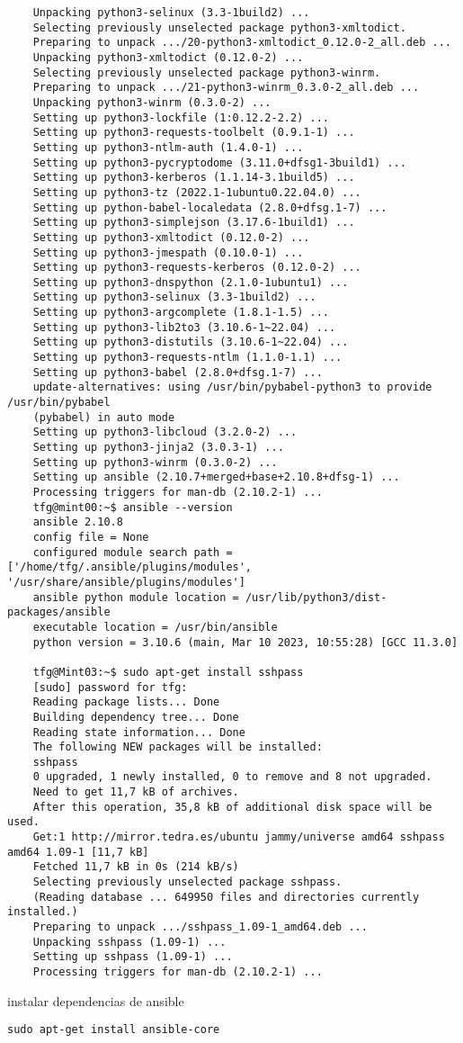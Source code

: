\documentclass[../main.tex]{subfiles}
\begin{document}
\begin{lstlisting}
	Unpacking python3-selinux (3.3-1build2) ...
	Selecting previously unselected package python3-xmltodict.
	Preparing to unpack .../20-python3-xmltodict_0.12.0-2_all.deb ...
	Unpacking python3-xmltodict (0.12.0-2) ...
	Selecting previously unselected package python3-winrm.
	Preparing to unpack .../21-python3-winrm_0.3.0-2_all.deb ...
	Unpacking python3-winrm (0.3.0-2) ...
	Setting up python3-lockfile (1:0.12.2-2.2) ...
	Setting up python3-requests-toolbelt (0.9.1-1) ...
	Setting up python3-ntlm-auth (1.4.0-1) ...
	Setting up python3-pycryptodome (3.11.0+dfsg1-3build1) ...
	Setting up python3-kerberos (1.1.14-3.1build5) ...
	Setting up python3-tz (2022.1-1ubuntu0.22.04.0) ...
	Setting up python-babel-localedata (2.8.0+dfsg.1-7) ...
	Setting up python3-simplejson (3.17.6-1build1) ...
	Setting up python3-xmltodict (0.12.0-2) ...
	Setting up python3-jmespath (0.10.0-1) ...
	Setting up python3-requests-kerberos (0.12.0-2) ...
	Setting up python3-dnspython (2.1.0-1ubuntu1) ...
	Setting up python3-selinux (3.3-1build2) ...
	Setting up python3-argcomplete (1.8.1-1.5) ...
	Setting up python3-lib2to3 (3.10.6-1~22.04) ...
	Setting up python3-distutils (3.10.6-1~22.04) ...
	Setting up python3-requests-ntlm (1.1.0-1.1) ...
	Setting up python3-babel (2.8.0+dfsg.1-7) ...
	update-alternatives: using /usr/bin/pybabel-python3 to provide /usr/bin/pybabel 
	(pybabel) in auto mode
	Setting up python3-libcloud (3.2.0-2) ...
	Setting up python3-jinja2 (3.0.3-1) ...
	Setting up python3-winrm (0.3.0-2) ...
	Setting up ansible (2.10.7+merged+base+2.10.8+dfsg-1) ...
	Processing triggers for man-db (2.10.2-1) ...
	tfg@mint00:~$ ansible --version
	ansible 2.10.8
	config file = None
	configured module search path = ['/home/tfg/.ansible/plugins/modules', '/usr/share/ansible/plugins/modules']
	ansible python module location = /usr/lib/python3/dist-packages/ansible
	executable location = /usr/bin/ansible
	python version = 3.10.6 (main, Mar 10 2023, 10:55:28) [GCC 11.3.0]
	
	tfg@Mint03:~$ sudo apt-get install sshpass
	[sudo] password for tfg:        
	Reading package lists... Done
	Building dependency tree... Done
	Reading state information... Done
	The following NEW packages will be installed:
	sshpass
	0 upgraded, 1 newly installed, 0 to remove and 8 not upgraded.
	Need to get 11,7 kB of archives.
	After this operation, 35,8 kB of additional disk space will be used.
	Get:1 http://mirror.tedra.es/ubuntu jammy/universe amd64 sshpass amd64 1.09-1 [11,7 kB]
	Fetched 11,7 kB in 0s (214 kB/s)    
	Selecting previously unselected package sshpass.
	(Reading database ... 649950 files and directories currently installed.)
	Preparing to unpack .../sshpass_1.09-1_amd64.deb ...
	Unpacking sshpass (1.09-1) ...
	Setting up sshpass (1.09-1) ...
	Processing triggers for man-db (2.10.2-1) ...
\end{lstlisting}
instalar dependencias de ansible
\begin{lstlisting}
sudo apt-get install ansible-core
\end{lstlisting}
\end{document}
